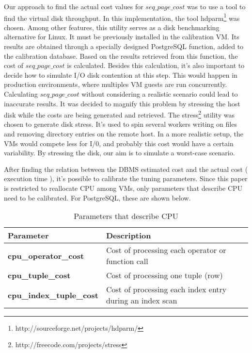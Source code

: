 Our approach to find the actual cost values for $seq\_page\_cost$ was to use a tool to find the virtual disk throughput. In this implementation, the tool hdparm\footnote{http://sourceforge.net/projects/hdparm/} was chosen. Among other features, this utility serves as a disk benchmarking alternative for Linux. It must be previously installed in the calibration VM. Its results are obtained through a specially designed PostgreSQL function, added to the calibration database. Based on the results retrieved from this function, the cost of $seq\_page\_cost$ is calculated. Besides this calculation, it's also important to decide how to simulate I/O disk contention at this step. This would happen in production environments, where multiples VM guests are run concurrently. Calculating $seq\_page\_cost$ without considering a realistic scenario could lead to inaccurate results. It was decided to magnify this problem by stressing the host disk while the costs are being generated and retrieved. The stress\footnote{
http://freecode.com/projects/stress} utility was chosen to generate disk stress. It's used to spin several 
workers writing on files and removing directory entries on the remote host. In a more realistic setup, the VMs would compete less for I/0, and probably this cost would have a certain variability. By stressing the disk, our aim is to simulate a worst-case scenario. 


After finding the relation between the DBMS estimated cost and the actual cost ( execution time ), it's possible to calibrate the tuning parameters. Since this paper is restricted to reallocate CPU among VMs, only parameters that describe CPU need to be calibrated. For PostgreSQL, these are shown below.

\begin{table}[ht]
    \centering
    \begin{tabular}{ | l | p{5cm} |}
    \hline
    Parameter & Description  \\ \hline
    \textbf{cpu\_operator\_cost} & Cost of processing each operator or function call \\ \hline
    \textbf{cpu\_tuple\_cost} & Cost of processing one tuple (row) \\ \hline
    \textbf{cpu\_index\_tuple\_cost} & Cost of processing each index entry during an index scan  \\
    \hline
    \end{tabular}
    \caption{Parameters that describe CPU}
    \label{table:descriptive}
\end{table}


